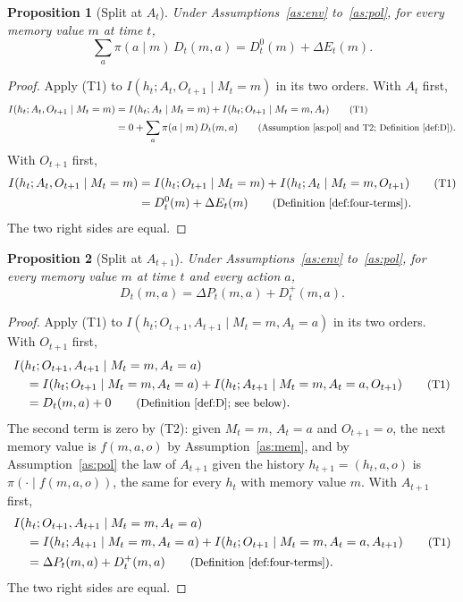 \documentclass{article}
\newtheorem{proposition}{Proposition}[section]
\theoremstyle{definition}
\numberwithin{equation}{section}
\newcommand{\dE}{\Delta E}
\newcommand{\dP}{\Delta P}
\newcommand{\why}[1]{\tag*{\small(#1)}}
\begin{document}
\begin{proposition}[Split at $A_t$]\label{prop:split1}
Under Assumptions~\ref{as:env} to~\ref{as:pol}, for every memory value $m$ at time $t$,
\[
\sum_a\pi(a\mid m)\,D_t(m,a)=D^0_t(m)+\dE_t(m).
\]
\end{proposition}

\begin{proof}
Apply (T1) to $I(h_t;A_t,O_{t+1}\mid M_t=m)$ in its two orders. With $A_t$ first,
\begin{align*}
I(h_t;A_t,O_{t+1}\mid M_t=m)&=I(h_t;A_t\mid M_t=m)+I(h_t;O_{t+1}\mid M_t=m,A_t) \why{T1}\\
&=0+\sum_a\pi(a\mid m)\,D_t(m,a) \why{Assumption~\ref{as:pol} and T2; Definition~\ref{def:D}}.
\end{align*}
With $O_{t+1}$ first,
\begin{align*}
I(h_t;A_t,O_{t+1}\mid M_t=m)&=I(h_t;O_{t+1}\mid M_t=m)+I(h_t;A_t\mid M_t=m,O_{t+1}) \why{T1}\\
&=D^0_t(m)+\dE_t(m) \why{Definition~\ref{def:four-terms}}.
\end{align*}
The two right sides are equal.
\end{proof}

\begin{proposition}[Split at $A_{t+1}$]\label{prop:split2}
Under Assumptions~\ref{as:env} to~\ref{as:pol}, for every memory value $m$ at time $t$ and every action $a$,
\[
D_t(m,a)=\dP_t(m,a)+D^+_t(m,a).
\]
\end{proposition}

\begin{proof}
Apply (T1) to $I(h_t;O_{t+1},A_{t+1}\mid M_t=m,A_t=a)$ in its two orders. With $O_{t+1}$ first,
\begin{align*}
&I(h_t;O_{t+1},A_{t+1}\mid M_t=m,A_t=a)\\
&\quad=I(h_t;O_{t+1}\mid M_t=m,A_t=a)+I(h_t;A_{t+1}\mid M_t=m,A_t=a,O_{t+1}) \why{T1}\\
&\quad=D_t(m,a)+0 \why{Definition~\ref{def:D}; see below}.
\end{align*}
The second term is zero by (T2): given $M_t=m$, $A_t=a$ and $O_{t+1}=o$, the next memory value is $f(m,a,o)$ by Assumption~\ref{as:mem}, and by Assumption~\ref{as:pol} the law of $A_{t+1}$ given the history $h_{t+1}=(h_t,a,o)$ is $\pi(\cdot\mid f(m,a,o))$, the same for every $h_t$ with memory value $m$. With $A_{t+1}$ first,
\begin{align*}
&I(h_t;O_{t+1},A_{t+1}\mid M_t=m,A_t=a)\\
&\quad=I(h_t;A_{t+1}\mid M_t=m,A_t=a)+I(h_t;O_{t+1}\mid M_t=m,A_t=a,A_{t+1}) \why{T1}\\
&\quad=\dP_t(m,a)+D^+_t(m,a) \why{Definition~\ref{def:four-terms}}.
\end{align*}
The two right sides are equal.
\end{proof}
\end{document}
